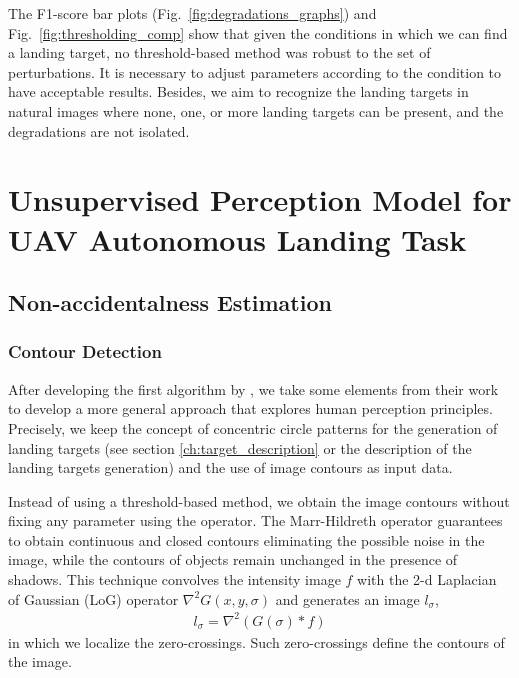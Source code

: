 The F1-score bar plots (Fig.\ \ref{fig:degradations_graphs}) and Fig.\ \ref{fig:thresholding_comp} show that given the conditions in which we can find a landing target, no threshold-based method was robust to the set of perturbations. It is necessary to adjust parameters according to the condition to have acceptable results. Besides, we aim to recognize the landing targets in natural images where none, one, or more landing targets can be present, and the degradations are not isolated.

\section{Unsupervised Perception Model for UAV Autonomous Landing Task}\label{sec:unsupervised_perception_model}
%
\subsection{Non-accidentalness Estimation}\label{subsec:Helmholtz}

\subsubsection{Contour Detection}\label{subsubsec:muiltiscale}

After developing the first algorithm by \citep{BaquedanoA.:ESIEE:2017}, we take some elements from their work to develop a more general approach that explores human perception principles. Precisely, we keep the concept of concentric circle patterns for the generation of landing targets (see section \ref{ch:target_description} or the description of the landing targets generation) and the use of image contours as input data.

Instead of using a threshold-based method, we obtain the image contours without fixing any parameter using the \cite{Marr.Hildreth:PRS:1980} operator. The Marr-Hildreth operator guarantees to obtain continuous and closed contours eliminating the possible noise in the image, while the contours of objects remain unchanged in the presence of shadows. This technique convolves the intensity image $f$ with the 2-d Laplacian of Gaussian (LoG) operator $\nabla^{2} G(x, y,\sigma)$ and generates an image $l_\sigma$, 
\begin{eqnarray}\label{eq:LoG}
l_\sigma =  \nabla^{2} (G(\sigma)\ast f)
\end{eqnarray}
in which we localize the zero-crossings. Such zero-crossings define the contours of the image.

